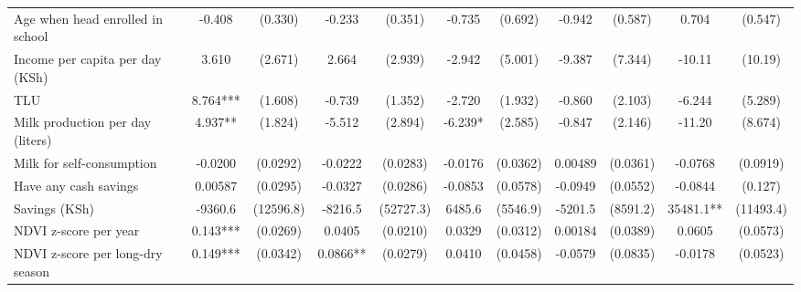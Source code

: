 \begin{tabular}{l*{5}{cc}}
Age when head enrolled in school&      -0.408   &     (0.330)&      -0.233   &     (0.351)&      -0.735   &     (0.692)&      -0.942   &     (0.587)&       0.704   &     (0.547)\\
Income per capita per day (KSh)&       3.610   &     (2.671)&       2.664   &     (2.939)&      -2.942   &     (5.001)&      -9.387   &     (7.344)&      -10.11   &     (10.19)\\
TLU         &       8.764***&     (1.608)&      -0.739   &     (1.352)&      -2.720   &     (1.932)&      -0.860   &     (2.103)&      -6.244   &     (5.289)\\
Milk production per day (liters)&       4.937** &     (1.824)&      -5.512   &     (2.894)&      -6.239*  &     (2.585)&      -0.847   &     (2.146)&      -11.20   &     (8.674)\\
Milk for self-consumption&     -0.0200   &    (0.0292)&     -0.0222   &    (0.0283)&     -0.0176   &    (0.0362)&     0.00489   &    (0.0361)&     -0.0768   &    (0.0919)\\
Have any cash savings&     0.00587   &    (0.0295)&     -0.0327   &    (0.0286)&     -0.0853   &    (0.0578)&     -0.0949   &    (0.0552)&     -0.0844   &     (0.127)\\
Savings (KSh)&     -9360.6   &   (12596.8)&     -8216.5   &   (52727.3)&      6485.6   &    (5546.9)&     -5201.5   &    (8591.2)&     35481.1** &   (11493.4)\\
NDVI z-score per year&       0.143***&    (0.0269)&      0.0405   &    (0.0210)&      0.0329   &    (0.0312)&     0.00184   &    (0.0389)&      0.0605   &    (0.0573)\\
NDVI z-score per long-dry season&       0.149***&    (0.0342)&      0.0866** &    (0.0279)&      0.0410   &    (0.0458)&     -0.0579   &    (0.0835)&     -0.0178   &    (0.0523)\\
\bottomrule
\end{tabular}
